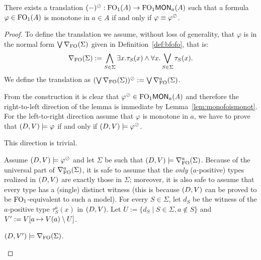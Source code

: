 \begin{lemma}
There exists a translation $(-)^\oslash:\mathrm{FO}_1(A) \to \mathrm{FO}_1\mathsf{MON}_{a}(A)$ such that
a formula ${\varphi \in \mathrm{FO}_1(A)}$ is monotone in $a\in A$ if and only if $\varphi\equiv \varphi^\oslash$.
\end{lemma}
%
\begin{proof}
To define the translation we assume, without loss of generality, that $\varphi$ is in the normal form $\bigvee \nabla_{\mathrm{FO}}(\Sigma)$ given in Definition~\ref{def:bfofo}, that is:
%
\[
\nabla_{\mathrm{FO}}(\Sigma) := \bigwedge_{S\in\Sigma} \exists x. \tau_S(x) \land \forall x. \bigvee_{S\in\Sigma} \tau_S(x).
\]
%
%
We define the translation as
$(\bigvee \nabla_{\mathrm{FO}}(\Sigma))^\oslash:= \bigvee \nabla^{a}_\mathrm{FO}(\Sigma)$.

From the construction it is clear that $\varphi^\oslash \in \mathrm{FO}_1\mathsf{MON}_{a}(A)$ and therefore the right-to-left direction of the lemma is immediate by Lemma~\ref{lem:monofoismonot}. For the left-to-right direction assume that $\varphi$ is monotone in $a$, we have to prove that $(D,V) \models \varphi$ if and only if $(D,V) \models \varphi^\oslash$.

\bigskip
\noindent \fbox{$\Rightarrow$} This direction is trivial.

\bigskip
\noindent \fbox{$\Leftarrow$} Assume $(D,V) \models \varphi^\oslash$ and let $\Sigma$ be such that $(D,V) \models \nabla^{a}_\mathrm{FO}(\Sigma)$. Because of the universal part of $\nabla^{a}_\mathrm{FO}(\Sigma)$, it is safe to assume that the \emph{only} ($a$-positive) types realized in $(D,V)$ are exactly those in $\Sigma$; moreover, it is also safe to assume that every type has a (single) distinct witness (this is because $(D,V)$ can be proved to be $\mathrm{FO}_1$-equivalent to such a model).
%
%
For every $S \in \Sigma$, let $d_S$ be the witness of the $a$-positive type $\tau^a_S(x)$ in $(D,V)$. Let $U := \{d_S \mid S\in \Sigma, a\notin S\}$ and $V' := V[a \mapsto V(a) \setminus U]$. 

\begin{claimfirst}
	$(D,V') \models \nabla_{\mathrm{FO}}(\Sigma)$.
\end{claimfirst}


\end{proof}
